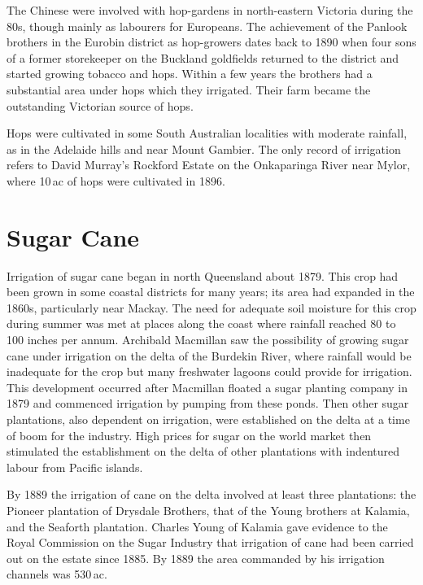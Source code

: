 The Chinese were involved with hop-gardens in north-eastern Victoria
during the 80s, though mainly as labourers for
Europeans.  The achievement of the Panlook brothers in the Eurobin
district as hop-growers dates back to 1890 when four sons of a former
storekeeper on the Buckland goldfields returned to the district and
started growing tobacco and hops.  Within a few years the brothers had
a substantial area under hops which they irrigated. Their farm became
the outstanding Victorian source of hops.

Hops were cultivated in some South Australian localities with moderate
rainfall, as in the Adelaide hills and near Mount Gambier.  The only
record of irrigation refers to David Murray's Rockford Estate on the
Onkaparinga River near Mylor, where 10\,ac of hops were cultivated in
1896.

\section*{Sugar Cane}

Irrigation of sugar cane began in north Queensland about
1879.  This
crop had been grown in some coastal districts for many years; its area
had expanded in the 1860s, particularly near Mackay.  The need for
adequate soil moisture for this crop during summer was met at places
along the coast where rainfall reached 80 to 100 inches per annum.
Archibald Macmillan saw the possibility of growing sugar cane under
irrigation on the delta of the Burdekin River, where rainfall would be
inadequate for the crop but many freshwater lagoons could provide for
irrigation.  This development occurred after Macmillan floated a sugar
planting company in 1879 and commenced irrigation by pumping from
these ponds.  Then other
sugar plantations, also dependent on irrigation, were established on
the delta at a time of boom for the industry.  High prices for sugar
on the world market then stimulated the establishment on the delta of
other plantations with indentured labour from Pacific islands.

By 1889 the irrigation of cane on the delta involved at least three
plantations: the Pioneer plantation of Drysdale Brothers, that of the
Young brothers at Kalamia, and the Seaforth plantation.  Charles Young of Kalamia gave
evidence to the Royal Commission on the Sugar Industry that irrigation
of cane had been carried out on the estate since 1885. By 1889 the
area commanded by his irrigation channels was 530\,ac.

